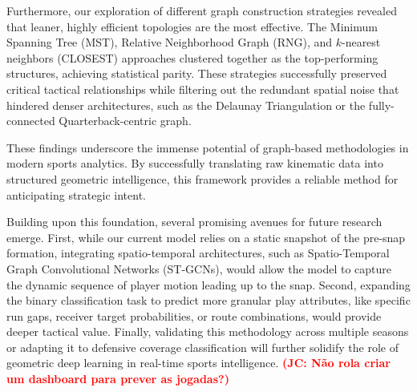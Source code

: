 \documentclass[runningheads]{llncs}
\newcommand{\jc}[1]{\textcolor{red}{\textbf{(JC: #1)}}}
\begin{document}
Furthermore, our exploration of different graph construction strategies revealed that leaner, highly efficient topologies are the most effective. The Minimum Spanning Tree (MST), Relative Neighborhood Graph (RNG), and $k$-nearest neighbors (CLOSEST) approaches clustered together as the top-performing structures, achieving statistical parity. These strategies successfully preserved critical tactical relationships while filtering out the redundant spatial noise that hindered denser architectures, such as the Delaunay Triangulation or the fully-connected Quarterback-centric graph.

These findings underscore the immense potential of graph-based methodologies in modern sports analytics. By successfully translating raw kinematic data into structured geometric intelligence, this framework provides a reliable method for anticipating strategic intent. 

Building upon this foundation, several promising avenues for future research emerge. First, while our current model relies on a static snapshot of the pre-snap formation, integrating spatio-temporal architectures, such as Spatio-Temporal Graph Convolutional Networks (ST-GCNs), would allow the model to capture the dynamic sequence of player motion leading up to the snap. Second, expanding the binary classification task to predict more granular play attributes, like specific run gaps, receiver target probabilities, or route combinations, would provide deeper tactical value. Finally, validating this methodology across multiple seasons or adapting it to defensive coverage classification will further solidify the role of geometric deep learning in real-time sports intelligence. \jc{Não rola criar um dashboard para prever as jogadas?}

\end{document}

